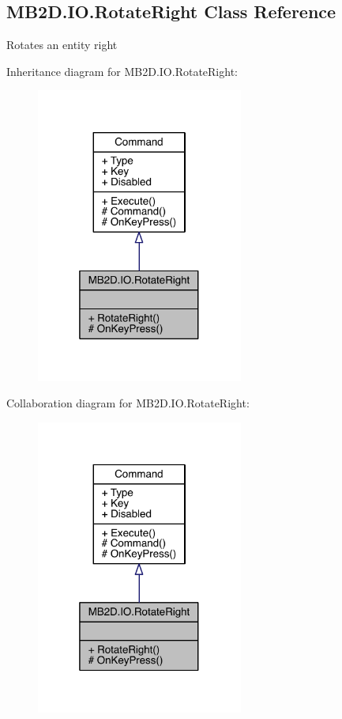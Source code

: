 \hypertarget{class_m_b2_d_1_1_i_o_1_1_rotate_right}{}\subsection{M\+B2\+D.\+I\+O.\+Rotate\+Right Class Reference}
\label{class_m_b2_d_1_1_i_o_1_1_rotate_right}


Rotates an entity right  




Inheritance diagram for M\+B2\+D.\+I\+O.\+Rotate\+Right\+:
\nopagebreak
\begin{figure}[H]
\begin{center}
\leavevmode
\includegraphics[width=193pt]{class_m_b2_d_1_1_i_o_1_1_rotate_right__inherit__graph}
\end{center}
\end{figure}


Collaboration diagram for M\+B2\+D.\+I\+O.\+Rotate\+Right\+:
\nopagebreak
\begin{figure}[H]
\begin{center}
\leavevmode
\includegraphics[width=193pt]{class_m_b2_d_1_1_i_o_1_1_rotate_right__coll__graph}
\end{center}
\end{figure}
